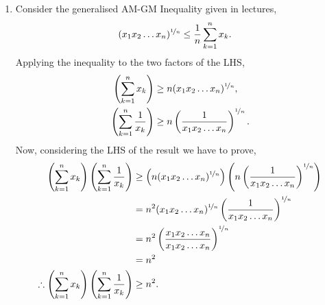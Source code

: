 \documentclass[a4paper,11pt]{article}
\begin{document}
{{\begin{enumerate}[leftmargin=*]
\begin{enumerate}
				\item Consider the generalised AM-GM Inequality given in lectures, 
					\begin{align*}
						(x_1x_2\dots x_n)^{\nicefrac{1}{n}} & \leq \frac{1}{n} \sum^n_{k=1} x_k.
					\end{align*}
					Applying the inequality to the two factors of the LHS,  
					\begin{align*}
						\left(\sum^n_{k=1} x_k\right) & \geq n(x_1x_2\dots x_n)^{\nicefrac{1}{n}},\\
						\left(\sum^n_{k=1} \frac{1}{x_k}\right) & \geq n\left(\frac{1}{x_1x_2\dots x_n}\right)^{\nicefrac{1}{n}}.
					\end{align*}
					Now, considering the LHS of the result we have to prove, 
					\begin{align*}
						\left(\sum^n_{k=1} x_k\right)\left(\sum^n_{k=1} \frac{1}{x_k}\right) & \geq \left(n(x_1x_2\dots x_n)^{\nicefrac{1}{n}}\right)\left(n\left(\frac{1}{x_1x_2\dots x_n}\right)^{\nicefrac{1}{n}}\right)\\
																							 & = n^2(x_1x_2\dots x_n)^{\nicefrac{1}{n}}\left(\frac{1}{x_1x_2\dots x_n}\right)^{\nicefrac{1}{n}}\\
																							 & = n^2\left(\frac{x_1x_2\dots x_n}{x_1x_2\dots x_n}\right)^{\nicefrac{1}{n}}\\
																							 & = n^2\\
						\therefore \left(\sum^n_{k=1} x_k\right)\left(\sum^n_{k=1} \frac{1}{x_k}\right) & \geq n^2.
					\end{align*}
					\bigbreak
			\end{enumerate}


\end{enumerate}}}
\end{document}
